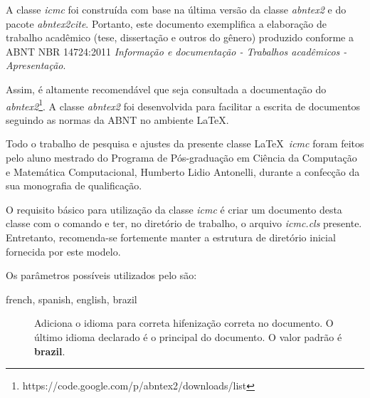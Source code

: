 A classe \textit{icmc} foi construída com base na última versão da classe \textit{abntex2} e do pacote \textit{abntex2cite}. Portanto, este documento exemplifica a elaboração de trabalho
acadêmico (tese, dissertação e outros do gênero) produzido conforme a ABNT NBR
14724:2011 \textit{Informação e documentação - Trabalhos acadêmicos - Apresentação}.

Assim, é altamente recomendável que seja consultada a documentação do \textit{abntex2}\footnote{https://code.google.com/p/abntex2/downloads/list}. A classe \textit{abntex2} foi desenvolvida para facilitar a escrita de documentos seguindo as normas da ABNT no ambiente \LaTeX\;\cite{frasson:2005:classe_abnt}.

Todo o trabalho de pesquisa e ajustes da presente classe \LaTeX~\emph{icmc} foram feitos pelo aluno mestrado do Programa de Pós-graduação em Ciência da Computação e Matemática Computacional, Humberto Lidio Antonelli, durante a confecção da sua monografia de qualificação.

O requisito básico para utilização da classe \textit{icmc} é criar um documento desta classe com o comando
 e ter, no diretório de trabalho, o arquivo \emph{icmc.cls} presente. Entretanto, recomenda-se fortemente manter a estrutura de diretório inicial fornecida por este modelo.

Os parâmetros possíveis utilizados pelo  são:
\begin{description}
\item[french, spanish, english, brazil] Adiciona o idioma para correta hifenização correta no documento. O último idioma declarado é o principal do documento. O valor padrão é \textbf{brazil}.
\end{description}

